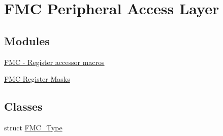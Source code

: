 \hypertarget{group__FMC__Peripheral__Access__Layer}{}\section{F\+MC Peripheral Access Layer}
\label{group__FMC__Peripheral__Access__Layer}
\subsection*{Modules}
\begin{DoxyCompactItemize}
\item 
\hyperlink{group__FMC__Register__Accessor__Macros}{F\+M\+C -\/ Register accessor macros}
\item 
\hyperlink{group__FMC__Register__Masks}{F\+M\+C Register Masks}
\end{DoxyCompactItemize}
\subsection*{Classes}
\begin{DoxyCompactItemize}
\item 
struct \hyperlink{structFMC__Type}{F\+M\+C\+\_\+\+Type}
\end{DoxyCompactItemize}
